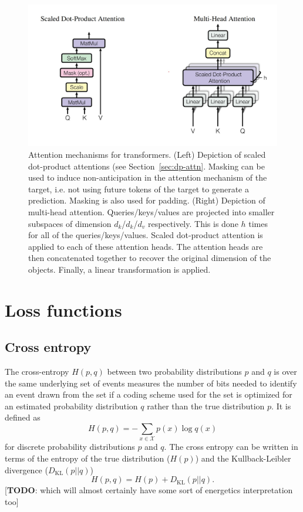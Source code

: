 \documentclass[11pt]{article}
\numberwithin{equation}{section}
\begin{document}
\begin{figure}
\begin{center}
\includegraphics[width=0.7\columnwidth]{../figures/multi-head-attn.jpg}  
\end{center}
\caption{Attention mechanisms for transformers. (Left) Depiction of scaled dot-product attentions (see Section~\ref{sec:dp-attn}. Masking can be used to induce non-anticipation in the attention mechanism of the target, i.e. not using future tokens of the target to generate a prediction. Masking is also used for padding. (Right) Depiction of multi-head attention. Queries/keys/values are projected into smaller subspaces of dimension $d_k$/$d_k$/$d_v$ respectively. This is done $h$ times for all of the queries/keys/values. Scaled dot-product attention is applied to each of these attention heads. The attention heads are then concatenated together to recover the original dimension of the objects. Finally, a linear transformation is applied.}
\label{fig:multi_head_attn}
\end{figure}



\section{Loss functions}

\subsection{Cross entropy}
The cross-entropy $H(p,q)$ between two probability distributions $p$ and $q$ is over the same underlying set of events measures the number of bits needed to identify an event drawn from the set if a coding scheme used for the set is optimized for an estimated probability distribution $q$ rather than the true distribution $p$. It is defined as 
\begin{equation}
H(p,q) = - \sum_{x \in \mathcal{X}} p(x) \log q(x)
\end{equation}
for discrete probability distributions $p$ and $q$. The cross entropy can be written in terms of the entropy of the true distribution ($H(p)$) and the Kullback-Leibler divergence ($D_{\text{KL}}(p||q)$)
\begin{equation}
H(p,q) = H(p) + D_{\text{KL}}(p||q).
\end{equation}
[\textbf{TODO}: which will almost certainly have some sort of energetics interpretation too] 
\end{document}
